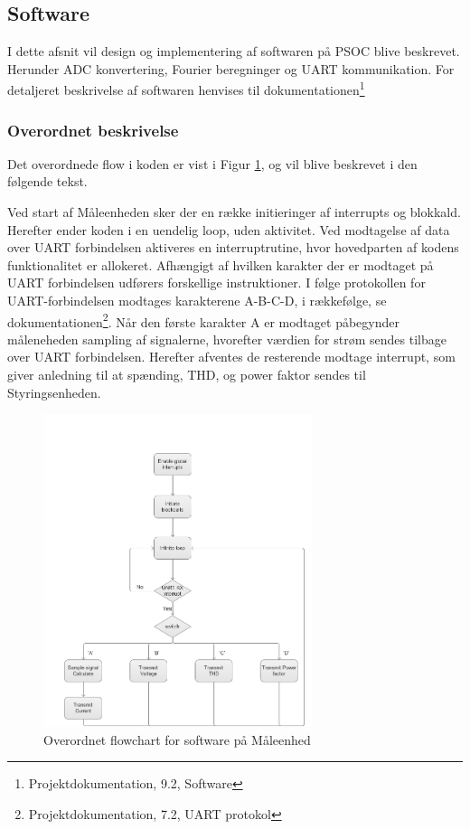 
\subsection{Software}
I dette afsnit vil design og implementering af softwaren på PSOC blive beskrevet. Herunder ADC konvertering, Fourier beregninger og  UART kommunikation. For detaljeret beskrivelse af softwaren henvises til dokumentationen\footnote{Projektdokumentation, 9.2, Software}

\subsubsection{Overordnet beskrivelse}
Det overordnede flow i koden er vist i Figur \ref{fig:MEflowchart}, og vil blive beskrevet i den følgende tekst.  

Ved start af Måleenheden sker der en række initieringer af interrupts og blokkald. Herefter ender koden i en uendelig loop, uden aktivitet. Ved modtagelse af data over UART forbindelsen aktiveres en interruptrutine, hvor hovedparten af kodens funktionalitet er allokeret. 
Afhængigt af hvilken karakter der er modtaget på UART forbindelsen udførers forskellige instruktioner. I følge protokollen for UART-forbindelsen modtages karakterene A-B-C-D, i rækkefølge, se dokumentationen\footnote{Projektdokumentation, 7.2, UART protokol}.
Når den første karakter A er modtaget påbegynder måleneheden sampling af signalerne, hvorefter værdien for strøm sendes tilbage over UART forbindelsen. Herefter afventes de resterende modtage interrupt, som giver anledning til at spænding, THD, og power faktor sendes til Styringsenheden. 
\begin{figure}[h] %
	\centering
	\includegraphics[width=0.7\textwidth]{Figure/MEflowchart.png}
	\caption{Overordnet flowchart for software på Måleenhed}
	\label{fig:MEflowchart}
\end{figure}




